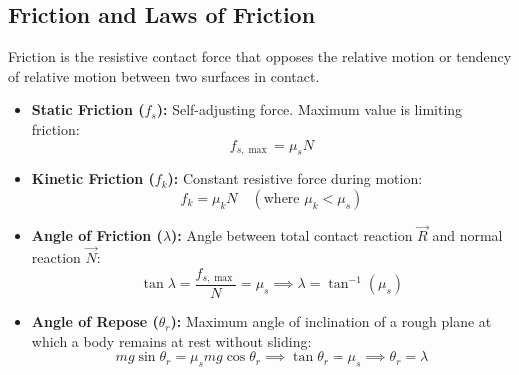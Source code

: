 \documentclass[12pt,a4paper]{article}
\begin{document}
\subsection{Friction and Laws of Friction}

Friction is the resistive contact force that opposes the relative motion or tendency of relative motion between two surfaces in contact.

\begin{tcolorbox}[formulabox, title={\textbf{Key Laws and Relations of Friction}}]
\begin{itemize}[leftmargin=*, itemsep=2pt]
  \item \textbf{Static Friction ($f_s$):} Self-adjusting force. Maximum value is limiting friction:
  \begin{equation}
  f_{s,\max} = \mu_s N
  \end{equation}
  \item \textbf{Kinetic Friction ($f_k$):} Constant resistive force during motion:
  \begin{equation}
  f_k = \mu_k N \quad (\text{where } \mu_k < \mu_s)
  \end{equation}
  \item \textbf{Angle of Friction ($\lambda$):} Angle between total contact reaction $\vec{R}$ and normal reaction $\vec{N}$:
  \begin{equation}
  \tan \lambda = \frac{f_{s,\max}}{N} = \mu_s \implies \lambda = \tan^{-1}(\mu_s)
  \end{equation}
  \item \textbf{Angle of Repose ($\theta_r$):} Maximum angle of inclination of a rough plane at which a body remains at rest without sliding:
  \begin{equation}
  m g \sin \theta_r = \mu_s m g \cos \theta_r \implies \tan \theta_r = \mu_s \implies \theta_r = \lambda
  \end{equation}
\end{itemize}
\end{tcolorbox}
\end{document}
